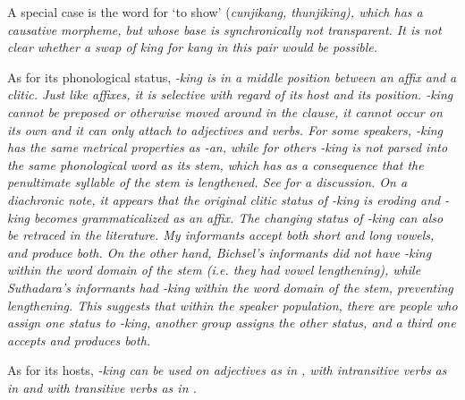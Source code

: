 A special case is the word for `to show' (\em cunjikang, thunjiking\em), which has a causative morpheme, but whose base is synchronically not transparent. It is not clear whether a swap of \em king \em for \em kang \em in this pair would be possible.

As for its phonological status, \label{page:morph:king} \em -king \em is in a middle position between an affix and a clitic. Just like affixes, it is selective with regard of its host and its position. \em -king \em cannot be preposed or otherwise moved around in the clause, it cannot occur on its own and it can only attach to adjectives and verbs. For some speakers, \em -king \em has the same metrical properties as \em -an\em, while for others \em -king \em is not parsed into the same phonological word as its stem, which has as a consequence that the penultimate syllable of the stem is lengthened. See  for a discussion. On a diachronic note, it appears that the original clitic status of \em -king \em is eroding and \em -king \em becomes grammaticalized as an affix.
The changing status of \em -king \em can also be retraced in the literature. My informants accept both short and long vowels, and produce both. On the other hand, Bichsel's informants  did not have \em -king \em within the word domain of the stem (i.e. they had vowel lengthening), while Suthadara's informants had \em -king \em within the word domain of the stem, preventing lengthening. This suggests that within the speaker population, there are people who assign one status to \em -king\em, another group assigns the other status, and a third one accepts and produces both.

As for its hosts, \em -king \em can be used on adjectives as in , with intransitive verbs as in  and with transitive verbs as in .


\\ 

\\ 

